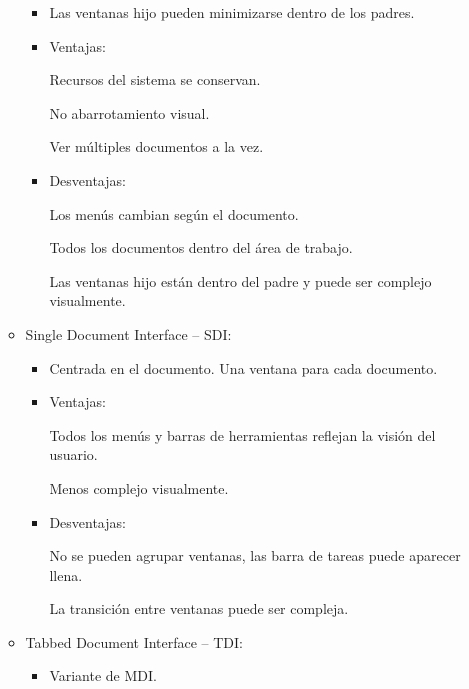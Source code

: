 \documentclass[12pt, twoside, openright]{report} %
\begin{document}
\begin{itemize}
\begin{itemize}
\begin{itemize}
			            \item Las ventanas hijo pueden minimizarse dentro de los padres.

			            \item Ventajas:

			                  Recursos del sistema se conservan.

			                  No abarrotamiento visual.

			                  Ver múltiples documentos a la vez.


			            \item Desventajas:

			                  Los menús cambian según el documento.

			                  Todos los documentos dentro del área de trabajo.

			                  Las ventanas hijo están dentro del padre y puede ser
			                  complejo visualmente.

		            \end{itemize}

		      \item Single Document Interface -- SDI:

		            \begin{itemize}
			            \item Centrada en el documento. Una ventana para cada documento.

			            \item Ventajas:

			                  Todos los menús y barras de herramientas reflejan la
			                  visión del usuario.

			                  Menos complejo visualmente.


			            \item Desventajas:

			                  No se pueden agrupar ventanas, las barra de tareas puede
			                  aparecer llena.

			                  La transición entre ventanas puede ser compleja.

		            \end{itemize}

		      \item Tabbed Document Interface -- TDI:

		            \begin{itemize}
			            \item Variante de MDI.


\end{itemize}
\end{itemize}
\end{itemize}
\end{document}
